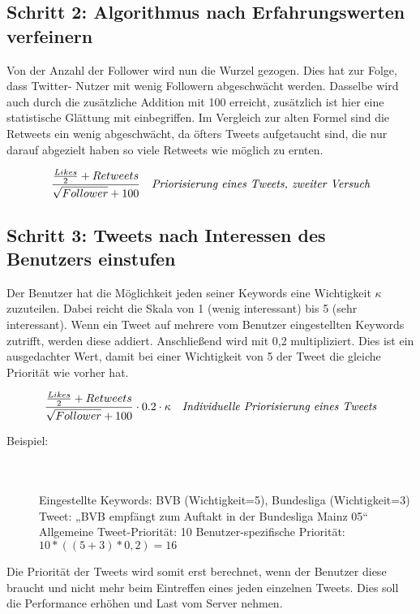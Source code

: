 \subsection*{Schritt 2: Algorithmus nach Erfahrungswerten verfeinern}

Von der Anzahl der Follower wird nun die Wurzel gezogen. Dies hat zur Folge, dass Twitter-
Nutzer mit wenig Followern abgeschwächt werden. Dasselbe wird auch durch die zusätzliche 
Addition mit 100 erreicht, zusätzlich ist hier eine statistische Glättung mit 
einbegriffen. Im Vergleich zur alten Formel sind die Retweets ein wenig abgeschwächt, da 
öfters Tweets aufgetaucht sind, die nur darauf abgezielt haben so viele Retweets wie 
möglich zu ernten. 

\begin{equation}
\frac{\frac{Likes}{2} + Retweets}{\sqrt{Follower} + 100} 
\quad
\text{\textit{Priorisierung eines Tweets, zweiter Versuch}}
\end{equation}

\subsection*{Schritt 3: Tweets nach Interessen des Benutzers einstufen}

Der Benutzer hat die Möglichkeit jeden seiner Keywords eine Wichtigkeit \(\kappa\) zuzuteilen. Dabei reicht 
die Skala von 1 (wenig interessant) bis 5 (sehr interessant).  Wenn ein Tweet auf mehrere vom Benutzer 
eingestellten Keywords zutrifft, werden diese addiert. Anschließend wird mit 0,2 multipliziert. Dies ist ein 
ausgedachter Wert, damit bei einer Wichtigkeit von 5 der Tweet die gleiche Priorität wie vorher hat. 

\begin{equation}
\frac{\frac{Likes}{2} + Retweets}{\sqrt{Follower} + 100} \cdot 0.2 \cdot \kappa 
\quad
\text{\textit{Individuelle Priorisierung eines Tweets}}
\end{equation}
\bigskip 
\begin{description}
	\item [Beispiel:] \hfill \\\\ Eingestellte Keywords: BVB (Wichtigkeit=5), Bundesliga (Wichtigkeit=3) \newline Tweet: „BVB empfängt zum Auftakt in der Bundesliga Mainz 05“ \newline Allgemeine Tweet-Priorität: 10 \newline Benutzer-spezifische Priorität: \(10 * ((5 + 3) * 0,2) = 16 \) 
\end{description}
Die Priorität der Tweets wird somit erst berechnet, wenn der Benutzer diese braucht und nicht mehr beim 
Eintreffen eines jeden einzelnen Tweets. Dies soll die Performance erhöhen und Last vom Server nehmen. 